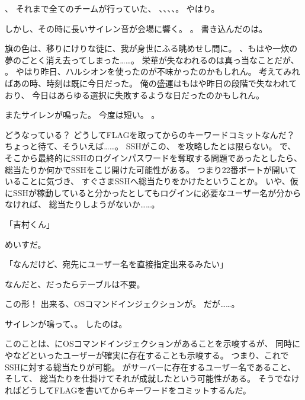 、
それまで全てのチームが行っていた、
\urandom、\ZxZ、\wasamusume、\mofupp、。
やはり。

しかし、その時に長いサイレン音が会場に響く。
。
書き込んだのは\ZxZ。

旗の色は、移りにけりな徒に、我が身世にふる眺めせし間に。
、もはや一炊の夢のごとく消え去ってしまった……。
栄華が失なわれるのは真っ当なことだが、
。
やはり昨日、ハルシオンを使ったのが不味かったのかもしれん。
考えてみればあの時、時刻は既に今日だった。
俺の盛運はもはや昨日の段階で失なわれており、
今日はあらゆる選択に失敗するような日だったのかもしれん。

またサイレンが鳴った。
今度は短い。
。

どうなっている？
どうしてFLAGを取ってからのキーワードコミットなんだ？
ちょっと待て、そういえば……。
SSHがこの、
を攻略したとは限らない。
で、
そこから最終的にSSHのログインパスワードを奪取する問題であったとしたら、
総当たりか何かでSSHをこじ開けた可能性がある。
つまり22番ポートが開いていることに気づき、
すぐさまSSHへ総当たりをかけたということか。
いや、仮にSSHが稼動していると分かったとしてもログインに必要なユーザー名が分からなければ、
総当たりしようがないか……。

「吉村くん」

めいすだ。

「なんだけど、宛先にユーザー名を直接指定出来るみたい」

なんだと、だったらテーブルは不要。



この形！
出来る、OSコマンドインジェクションが。
だが……。

サイレンが鳴って、。
したのは\ZxZ。

このことは、にOSコマンドインジェクションがあることを示唆するが、
同時にやなどといったユーザーが確実に存在することも示唆する。
つまり、これでSSHに対する総当たりが可能。
がサーバーに存在するユーザー名であること、
そして、
総当たりを仕掛けてそれが成就したという可能性がある。
そうでなければどうしてFLAGを書いてからキーワードをコミットするんだ。

